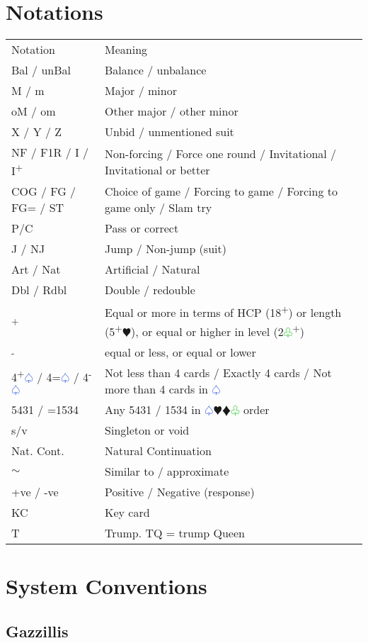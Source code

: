 \documentclass{article}
\renewcommand{\sp}{\textcolor{RoyalBlue}{$\varspade$}}
\newcommand{\he}{\textcolor{RubineRed}{$\varheart$}}
\newcommand{\di}{\textcolor{Peach}{$\vardiamond$}}
\newcommand{\cl}{\textcolor{LimeGreen}{$\varclub$}}
\newcommand{\up}{\textsuperscript{+}}
\newcommand{\down}{\textsuperscript{-}}
\begin{document}
\section{Notations}
\begin{tabular}{|l|p{5.5cm}}
	Notation & Meaning \\
	Bal / unBal & Balance / unbalance \\
	M / m & Major / minor \\
	oM / om & Other major / other minor \\
	X / Y / Z & Unbid / unmentioned suit \\
	NF / F1R / I / I\up & Non-forcing / Force one round / Invitational / Invitational or better \\
	COG / FG / FG= / ST & Choice of game / Forcing to game / Forcing to game only / Slam try \\
	P/C & Pass or correct  \\
	J / NJ & Jump / Non-jump (suit) \\
	Art / Nat & Artificial / Natural \\
	Dbl / Rdbl & Double / redouble \\
	\up{} & Equal or more in terms of HCP (18\up{}) or length (5\up\he{}), or equal or higher in level (2\cl{}\up{}) \\
	\down{} & equal or less, or equal or lower \\
	4\up\sp{} / 4=\sp{} / 4\down\sp{} & Not less than 4 cards / Exactly 4 cards / Not more than 4 cards in \sp{}\\
	5431 / =1534 & Any 5431 / 1534 in \sp{}\he{}\di{}\cl{} order \\
	s/v & Singleton or void \\
 	Nat. Cont. & Natural Continuation \\
	$\sim$ & Similar to / approximate \\
	+ve / -ve & Positive / Negative (response) \\
	KC & Key card \\
	T & Trump. TQ = trump Queen  \\
\end{tabular}

\section{System Conventions}
\subsection{Gazzillis}
\end{document}
